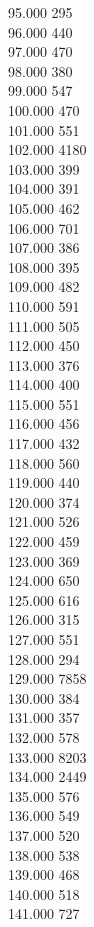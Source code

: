 { 95.000	295 \\
 96.000	440 \\
 97.000	470 \\
 98.000	380 \\
 99.000	547 \\
 100.000	470 \\
 101.000	551 \\
 102.000	4180 \\
 103.000	399 \\
 104.000	391 \\
 105.000	462 \\
 106.000	701 \\
 107.000	386 \\
 108.000	395 \\
 109.000	482 \\
 110.000	591 \\
 111.000	505 \\
 112.000	450 \\
 113.000	376 \\
 114.000	400 \\
 115.000	551 \\
 116.000	456 \\
 117.000	432 \\
 118.000	560 \\
 119.000	440 \\
 120.000	374 \\
 121.000	526 \\
 122.000	459 \\
 123.000	369 \\
 124.000	650 \\
 125.000	616 \\
 126.000	315 \\
 127.000	551 \\
 128.000	294 \\
 129.000	7858 \\
 130.000	384 \\
 131.000	357 \\
 132.000	578 \\
 133.000	8203 \\
 134.000	2449 \\
 135.000	576 \\
 136.000	549 \\
 137.000	520 \\
 138.000	538 \\
 139.000	468 \\
 140.000	518 \\
 141.000	727 \\
}

